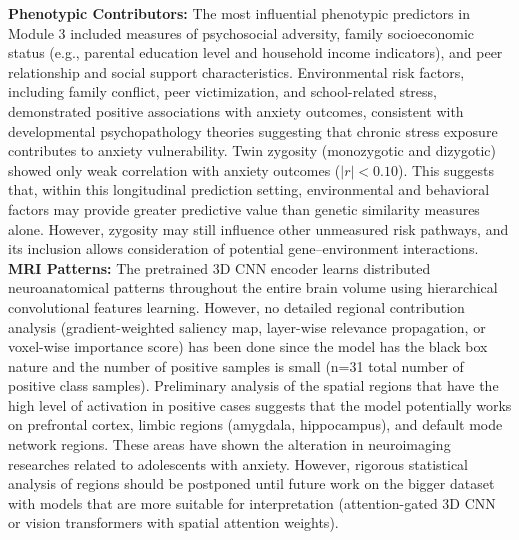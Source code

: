 \documentclass[10pt,letterpaper]{article}
\begin{document}
\textbf{Phenotypic Contributors:} The most influential phenotypic predictors in Module 3 included measures of psychosocial adversity, family socioeconomic status (e.g., parental education level and household income indicators), and peer relationship and social support characteristics. Environmental risk factors, including family conflict, peer victimization, and school-related stress, demonstrated positive associations with anxiety outcomes, consistent with developmental psychopathology theories suggesting that chronic stress exposure contributes to anxiety vulnerability. Twin zygosity (monozygotic and dizygotic) showed only weak correlation with anxiety outcomes ($|r| < 0.10$). This suggests that, within this longitudinal prediction setting, environmental and behavioral factors may provide greater predictive value than genetic similarity measures alone. However, zygosity may still influence other unmeasured risk pathways, and its inclusion allows consideration of potential gene--environment interactions.
\\ \textbf{MRI Patterns:} The pretrained 3D CNN encoder learns distributed neuroanatomical patterns throughout the
entire brain volume using hierarchical convolutional features learning. However, no detailed
regional contribution analysis (gradient-weighted saliency map, layer-wise relevance
propagation, or voxel-wise importance score) has been done since the model has the black box
nature and the number of positive samples is small (n=31 total number of positive class
samples). Preliminary analysis of the spatial regions that have the high level of activation in
positive cases suggests that the model potentially works on prefrontal cortex, limbic regions
(amygdala, hippocampus), and default mode network regions. These areas have shown the
alteration in neuroimaging researches related to adolescents with anxiety. However, rigorous
statistical analysis of regions should be postponed until future work on the bigger dataset with
models that are more suitable for interpretation (attention-gated 3D CNN or vision
transformers with spatial attention weights).
\end{document}
